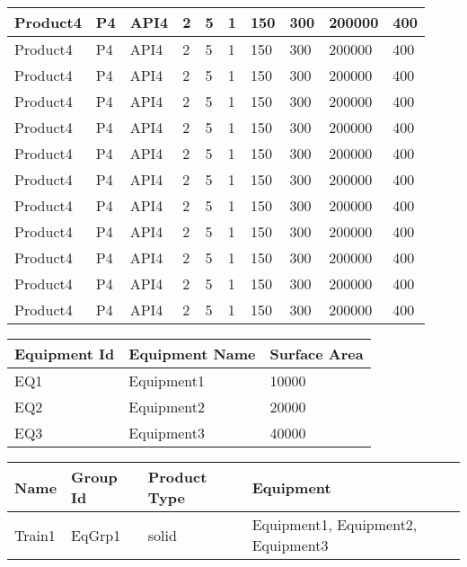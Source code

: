 \documentclass{article}
\begin{document}
\begin{longtable}[l]{|p{1.5cm}|p{1.7cm}|p{1cm}|p{1.5cm}|p{1.7cm}|p{1cm}|p{1cm}|p{1cm}|p{1cm}|p{1.5cm}|}
\hline
Product4 & P4 & API4 & 2 & 5 & 1 & 150 & 300 & 200000 & 400\\
\hline
Product4 & P4 & API4 & 2 & 5 & 1 & 150 & 300 & 200000 & 400\\
\hline
Product4 & P4 & API4 & 2 & 5 & 1 & 150 & 300 & 200000 & 400\\
\hline
Product4 & P4 & API4 & 2 & 5 & 1 & 150 & 300 & 200000 & 400\\
\hline
Product4 & P4 & API4 & 2 & 5 & 1 & 150 & 300 & 200000 & 400\\
\hline
Product4 & P4 & API4 & 2 & 5 & 1 & 150 & 300 & 200000 & 400\\
\hline
Product4 & P4 & API4 & 2 & 5 & 1 & 150 & 300 & 200000 & 400\\
\hline
Product4 & P4 & API4 & 2 & 5 & 1 & 150 & 300 & 200000 & 400\\
\hline
Product4 & P4 & API4 & 2 & 5 & 1 & 150 & 300 & 200000 & 400\\
\hline
Product4 & P4 & API4 & 2 & 5 & 1 & 150 & 300 & 200000 & 400\\
\hline
Product4 & P4 & API4 & 2 & 5 & 1 & 150 & 300 & 200000 & 400\\
\hline
Product4 & P4 & API4 & 2 & 5 & 1 & 150 & 300 & 200000 & 400\\
\hline

    \end{longtable}
    
        \begin{longtable}[l]{|p{2.5cm}|p{3cm}|p{3.5cm}|}

\hline
Equipment Id & Equipment Name & Surface Area\\
\hline

EQ1 & Equipment1 & 10000\\
\hline
EQ2 & Equipment2 & 20000\\
\hline
EQ3 & Equipment3 & 40000\\
\hline

    \end{longtable}
    
        \begin{longtable}[l]{|p{2.5cm}|p{1.5cm}|p{1.8cm}|p{6cm}|}

\hline
Name & Group Id & Product Type & Equipment\\
\hline

Train1 & EqGrp1 & solid & Equipment1, Equipment2, Equipment3\\
\hline

    \end{longtable}
    
\end{document}
